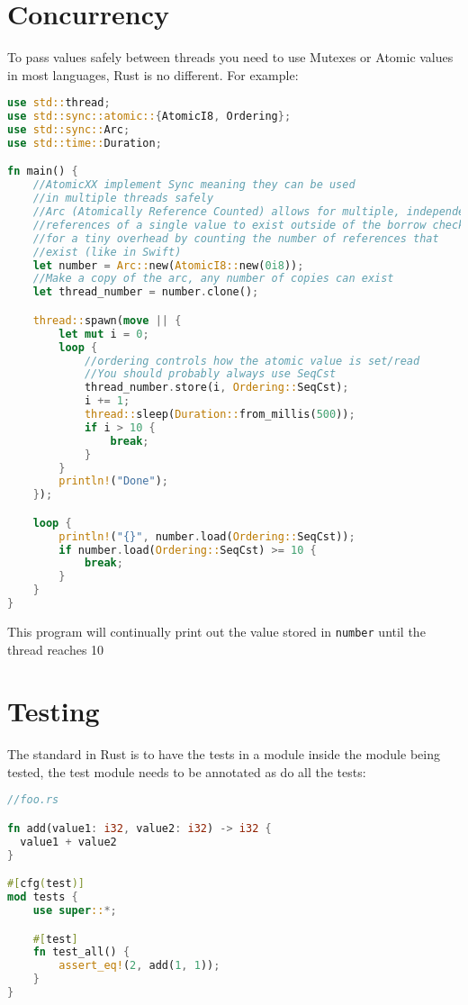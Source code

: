 \documentclass[a4paper,11pt]{article}
\begin{document}
\newpage
\section{Concurrency}

To pass values safely between threads you need to use Mutexes or Atomic values in most languages, Rust is no different. For example:
\begin{lstlisting}[language=Rust,frame=single]
use std::thread;
use std::sync::atomic::{AtomicI8, Ordering};
use std::sync::Arc;
use std::time::Duration;

fn main() {
    //AtomicXX implement Sync meaning they can be used 
    //in multiple threads safely
    //Arc (Atomically Reference Counted) allows for multiple, independent
    //references of a single value to exist outside of the borrow checker
    //for a tiny overhead by counting the number of references that
    //exist (like in Swift) 
    let number = Arc::new(AtomicI8::new(0i8));
    //Make a copy of the arc, any number of copies can exist
    let thread_number = number.clone();

    thread::spawn(move || {
        let mut i = 0;
        loop {
            //ordering controls how the atomic value is set/read
            //You should probably always use SeqCst
            thread_number.store(i, Ordering::SeqCst);
            i += 1;
            thread::sleep(Duration::from_millis(500));
            if i > 10 {
                break;
            }
        }
        println!("Done");
    });

    loop {
        println!("{}", number.load(Ordering::SeqCst));
        if number.load(Ordering::SeqCst) >= 10 {
            break;
        }
    }
}
\end{lstlisting}

This program will continually print out the value stored in \lstinline{number} until the thread reaches 10

\newpage
\section{Testing}
The standard in Rust is to have the tests in a module inside the module being tested, the test module needs to be annotated as do all the tests:
\begin{lstlisting}[language=Rust,frame=single]
//foo.rs 

fn add(value1: i32, value2: i32) -> i32 {
  value1 + value2
}

#[cfg(test)]
mod tests {
    use super::*;

    #[test]
    fn test_all() {
        assert_eq!(2, add(1, 1));
    }
}
\end{lstlisting}
\end{document}
